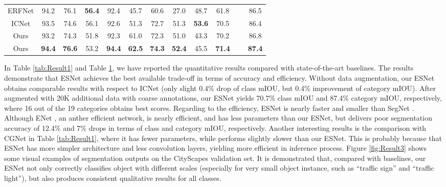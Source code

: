 \documentclass[runningheads]{llncs}
\begin{document}
\begin{table}[!t]
\begin{center}
\begin{tabular}{|c|cccccccccc|c|}
ERFNet \cite{Romera2018erfnet}         &94.2 &76.1 &\textbf{56.4} &92.4 &45.7 &60.6 &27.0 &48.7 &61.8 &~ &86.5\\
ICNet \cite{Zhao2018ICnet}             &93.5 &74.6 &56.1 &92.6 &51.3 &72.7 &51.3 &\textbf{53.6} &70.5 &~ &86.4\\
\hline
Ours                                   &93.2 &74.3 &51.8 &92.3 &61.0 &72.3 &51.0 &43.3 &70.2 &~ &86.8\\
Ours                          &\textbf{94.4} &\textbf{76.6} &53.2 &\textbf{94.4} &\textbf{62.5} &\textbf{74.3} &\textbf{52.4} &45.5 &\textbf{71.4} &~ &\textbf{87.4}\\
\hline
\end{tabular}
\end{center}\label{tab:Result2}
\end{table}

In Table \ref{tab:Result1} and Table \ref{tab:Result2}, we have reported the quantitative results compared with state-of-the-art baselines. The results demonstrate that ESNet achieves the best available trade-off in terms of accuracy and efficiency. Without data augmentation, our ESNet obtains comparable results with respect to ICNet \cite{Zhao2018ICnet} (only slight 0.4\% drop of class mIOU, but 0.4\% improvement of category mIOU). After augmented with 20K additional data with coarse annotations, our ESNet yields 70.7\% class mIOU and 87.4\% category mIOU, respectively, where 16 out of the 19 categories obtains best scores. Regarding to the efficiency, ESNet is nearly  faster and  smaller than SegNet \cite{Badrinarayanan2015Segnet}. Although ENet \cite{Paszke2016enet}, an anther efficient network, is nearly  efficient, and has  less parameters than our ESNet, but delivers poor segmentation accuracy of 12.4\% and 7\% drops in terms of class and category mIOU, respectively. Another interesting results is the comparison with CGNet \cite{wu2018cgnet} in Table \ref{tab:Result1}, where it has  fewer parameters, while performs slightly slower than our ESNet. This is probably because that ESNet has more simpler architecture and less convolution layers, yielding more efficient in inference process. Figure \ref{fig:Result3} shows some visual examples of segmentation outputs on the CityScapes validation set. It is demonstrated that, compared with baselines, our ESNet not only correctly classifies object with different scales (especially for very small object instance, such as ``traffic sign'' and ``traffic light''), but also produces consistent qualitative results for all classes.
\end{document}
